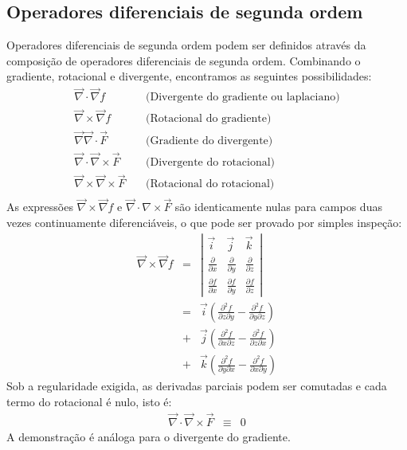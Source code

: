 \subsection{Operadores diferenciais de segunda ordem}
Operadores diferenciais de segunda ordem podem ser definidos através da composição de operadores diferenciais de segunda ordem. Combinando o gradiente, rotacional e divergente, encontramos as seguintes possibilidades:
\begin{eqnarray}
  \vec{\nabla} \cdot \vec{\nabla} f&~& \text{(Divergente do gradiente ou laplaciano)}\\
  \vec{\nabla} \times \vec{\nabla} f&~& \text{(Rotacional do gradiente)}\\
  \vec{\nabla} \vec{\nabla}\cdot \vec{F}&~& \text{(Gradiente do divergente)}\\
  \vec{\nabla} \cdot\vec{\nabla}\times \vec{F}&~& \text{(Divergente do rotacional)}\\
  \vec{\nabla} \times\vec{\nabla}\times \vec{F}&~& \text{(Rotacional do rotacional)}\\
  \end{eqnarray}
As expressões $\vec{\nabla} \times \vec{\nabla} f$ e $\vec{\nabla} \cdot{\nabla}\times \vec{F}$ são identicamente nulas para campos duas vezes continuamente diferenciáveis, o que pode ser provado por simples inspeção:
\begin{eqnarray}
 \vec{\nabla} \times \vec{\nabla} f &=&\left|
 \begin{array}{ccc}
 \vec{i} & \vec{j} & \vec{k} \\
 \frac{\partial}{\partial x} &\frac{\partial}{\partial y} &\frac{\partial}{\partial z} \\
\frac{\partial f}{\partial x} & \frac{\partial f}{\partial y} & \frac{\partial f}{\partial z}
 \end{array}
\right|\\
&=&\vec{i}\left(\frac{\partial^2 f }{\partial z\partial y} - \frac{\partial^2 f}{\partial y\partial z}\right)\\
&+& \vec{j}\left(\frac{\partial^2 f}{\partial  x\partial z}-\frac{\partial^2f}{\partial z\partial x}\right)\\
 &+& \vec{k}\left(\frac{\partial^2 f}{\partial y\partial x}-\frac{\partial^2 f}{\partial x\partial y}\right)
\end{eqnarray}
Sob a regularidade exigida, as derivadas parciais podem ser comutadas e cada termo do rotacional é nulo, isto é:
\begin{eqnarray}
 \vec{\nabla} \cdot \vec{\nabla}\times\vec{F} &\equiv &0
\end{eqnarray}
A demonstração é análoga para o divergente do gradiente.


